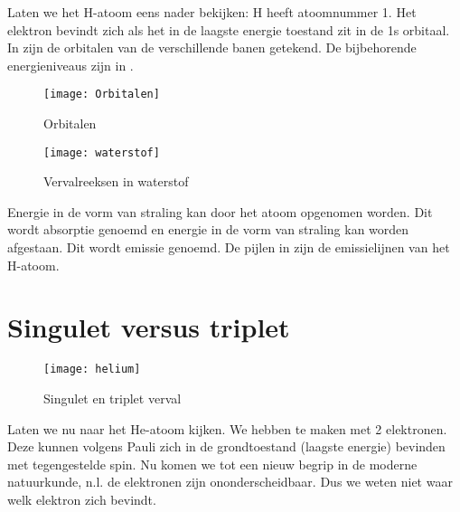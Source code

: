 Laten we het H-atoom eens nader bekijken: H heeft atoomnummer 1. Het
elektron bevindt zich als het in de laagste energie toestand zit in
de 1s orbitaal. In  zijn de orbitalen van
de verschillende banen getekend. De bijbehorende energieniveaus zijn
in .

\begin{figure}[h]
\noindent \begin{centering}
\texttt{[image: Orbitalen]}
\par\end{centering}

\caption{\label{fig:Orbitalen}Orbitalen}
\end{figure}


\begin{figure}[h]
\noindent \begin{centering}
\texttt{[image: waterstof]}
\par\end{centering}

\caption{\label{fig:Energieniveaux}Vervalreeksen in waterstof}
\end{figure}


Energie in de vorm van straling kan door het atoom opgenomen worden.
Dit wordt absorptie genoemd en energie in de vorm van straling kan
worden afgestaan. Dit wordt emissie genoemd. De pijlen in 
zijn de emissielijnen van het H-atoom. 


\section{Singulet versus triplet}

\begin{figure}[h]
\noindent \begin{centering}
\texttt{[image: helium]}
\par\end{centering}

\caption{\label{fig:Singulet-en-triplet}Singulet en triplet verval}
\end{figure}


Laten we nu naar het He-atoom kijken. We hebben te maken met 2 elektronen.
Deze kunnen volgens Pauli zich in de grondtoestand (laagste energie)
bevinden met tegengestelde spin. Nu komen we tot een nieuw begrip
in de moderne natuurkunde, n.l. de elektronen zijn ononderscheidbaar.
Dus we weten niet waar welk elektron zich bevindt.

